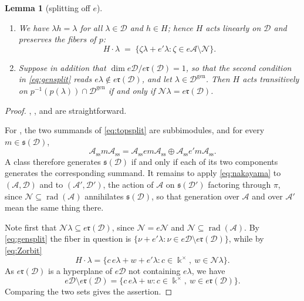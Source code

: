 \documentclass[12pt]{article}
\newtheorem{lemma}[lemma]{Lemma}
\theoremstyle{definition}
\newcommand{\topp}{\mathfrak{s}}
\newcommand{\rbm}{\mathfrak{r}}  %
\newcommand{\sms}{\operatorname{ss}}
\newcommand{\kk}{\Bbbk}
\newcommand{\alg}{\mathcal{A}}   %
\newcommand{\bmdl}{\mathcal{D}}   %
\newcommand{\rad}{\operatorname{rad}}
\newcommand{\gen}{\mathrm{gen}}         %
\begin{document}
\begin{lemma}[splitting off $e$]
\begin{enumerate}
\begin{equation}\label{eq:gensplit}
   \lambda \in \bmdl^{\gen}\iff
   p(\lambda) \in (\bmdl')^{\gen} \ \text{ and } \ e\lambda \text{
   generates the bimodule } e\bmdl/e\rbm(\bmdl).
\end{equation}
\item\label{cs:H} We have $\lambda h = \lambda$ for all $\lambda\in\bmdl$ and $h
\in H$; hence $H$ acts linearly on $\bmdl$ and preserves the fibers of $p$:
\begin{equation}\label{eq:Zorbit}
   H\cdot\lambda \;=\; \{\zeta\lambda + e'\lambda :
      \zeta \in e\alg\setminus \mathcal N\} .
\end{equation}
\item\label{cs:transitive} Suppose in addition that $\dim
e\bmdl/e\rbm(\bmdl) = 1$, so that the second condition in
\eqref{eq:gensplit} reads $e\lambda\notin e\rbm(\bmdl)$, and let $\lambda
\in \bmdl^{\gen}$. Then $H$ acts transitively on $p^{-1}(p(\lambda)) \cap
\bmdl^{\gen}$ if and only if $\mathcal N\lambda = e\rbm(\bmdl)$.
\end{enumerate}
\end{lemma}

\begin{proof}
, ,  and  are straightforward.

For , the two summands of
\eqref{eq:topsplit} are subbimodules, and for every $m\in\topp(\bmdl)$,
\[
\alg_{\sms}m\alg_{\sms}=\alg_{\sms}em\alg_{\sms}\oplus \alg_{\sms}e'm\alg_{\sms}.
\]
A class therefore generates $\topp(\bmdl)$ if and only if each of its two
components generates the corresponding summand. It remains to apply
\eqref{eq:nakayama} to $(\alg,\bmdl)$ and to $(\alg',\bmdl')$, the action
of $\alg$ on $\topp(\bmdl')$ factoring through $\pi$, since $\mathcal N \subseteq
\rad(\alg)$ annihilates $\topp(\bmdl)$, so that generation
over $\alg$ and over $\alg'$ mean the same thing there.

 Note first that $\mathcal N\lambda \subseteq
e\rbm(\bmdl)$, since $\mathcal N = e\mathcal N$ and $\mathcal N \subseteq \rad(\alg)$. By
\eqref{eq:gensplit} the fiber in question is $\{\nu+e'\lambda : \nu \in
e\bmdl\setminus e\rbm(\bmdl)\}$, while by \eqref{eq:Zorbit}
\[
   H\cdot\lambda = \{c\,e\lambda + w + e'\lambda :
      c \in \kk^\times,\ w \in \mathcal N\lambda\} .
\]
As $e\rbm(\bmdl)$ is a hyperplane of $e\bmdl$ not containing $e\lambda$,
we have
\[
e\bmdl\setminus e\rbm(\bmdl) = \{c\,e\lambda + w : c \in\kk^\times,\ w \in e\rbm(\bmdl)\}.
\]
Comparing the two sets gives the assertion.
\end{proof}
\end{document}
